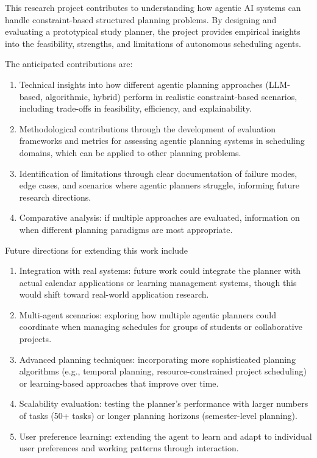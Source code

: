 \documentclass[12pt]{article}
\begin{document}
This research project contributes to understanding how agentic AI systems can handle constraint-based structured planning problems. By designing and evaluating a prototypical study planner, the project provides empirical insights into the feasibility, strengths, and limitations of autonomous scheduling agents.

The anticipated contributions are:

\begin{enumerate}
    \item Technical insights into how different agentic planning approaches (LLM-based, algorithmic, hybrid) perform in realistic constraint-based scenarios, including trade-offs in feasibility, efficiency, and explainability.

    \item Methodological contributions through the development of evaluation frameworks and metrics for assessing agentic planning systems in scheduling domains, which can be applied to other planning problems.

    \item Identification of limitations through clear documentation of failure modes, edge cases, and scenarios where agentic planners struggle, informing future research directions.

    \item Comparative analysis: if multiple approaches are evaluated, information on when different planning paradigms are most appropriate.
\end{enumerate}

Future directions for extending this work include
\begin{enumerate}
    \item Integration with real systems: future work could integrate the planner with actual calendar applications or learning management systems, though this would shift toward real-world application research.

    \item Multi-agent scenarios: exploring how multiple agentic planners could coordinate when managing schedules for groups of students or collaborative projects.

    \item Advanced planning techniques: incorporating more sophisticated planning algorithms (e.g., temporal planning, resource-constrained project scheduling) or learning-based approaches that improve over time.

    \item Scalability evaluation: testing the planner's performance with larger numbers of tasks (50+ tasks) or longer planning horizons (semester-level planning).

    \item User preference learning: extending the agent to learn and adapt to individual user preferences and working patterns through interaction.
\end{enumerate}
\end{document}

